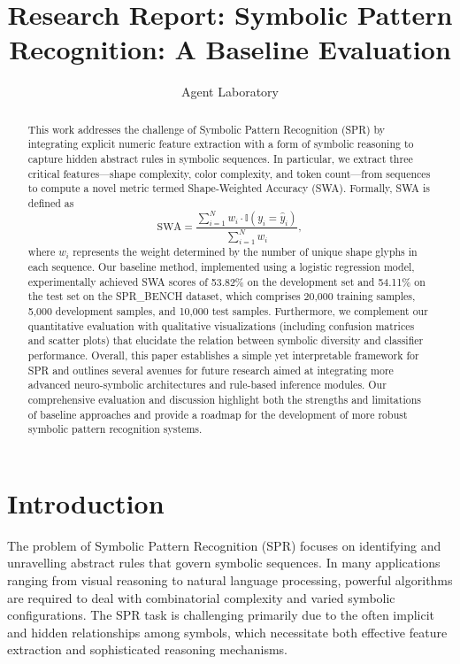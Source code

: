 \documentclass{article}
\title{Research Report: Symbolic Pattern Recognition: A Baseline Evaluation}
\author{Agent Laboratory}
\date{}
\begin{document}
\maketitle

\begin{abstract}
This work addresses the challenge of Symbolic Pattern Recognition (SPR) by integrating explicit numeric feature extraction with a form of symbolic reasoning to capture hidden abstract rules in symbolic sequences. In particular, we extract three critical features—shape complexity, color complexity, and token count—from sequences to compute a novel metric termed Shape-Weighted Accuracy (SWA). Formally, SWA is defined as 
\[
\text{SWA} = \frac{\sum_{i=1}^N w_i \cdot \mathbb{I}(y_i = \hat{y}_i)}{\sum_{i=1}^N w_i},
\]
where \(w_i\) represents the weight determined by the number of unique shape glyphs in each sequence. Our baseline method, implemented using a logistic regression model, experimentally achieved SWA scores of 53.82\% on the development set and 54.11\% on the test set on the SPR\_BENCH dataset, which comprises 20,000 training samples, 5,000 development samples, and 10,000 test samples. Furthermore, we complement our quantitative evaluation with qualitative visualizations (including confusion matrices and scatter plots) that elucidate the relation between symbolic diversity and classifier performance. Overall, this paper establishes a simple yet interpretable framework for SPR and outlines several avenues for future research aimed at integrating more advanced neuro-symbolic architectures and rule-based inference modules. Our comprehensive evaluation and discussion highlight both the strengths and limitations of baseline approaches and provide a roadmap for the development of more robust symbolic pattern recognition systems.
\end{abstract}

\section{Introduction}
The problem of Symbolic Pattern Recognition (SPR) focuses on identifying and unravelling abstract rules that govern symbolic sequences. In many applications ranging from visual reasoning to natural language processing, powerful algorithms are required to deal with combinatorial complexity and varied symbolic configurations. The SPR task is challenging primarily due to the often implicit and hidden relationships among symbols, which necessitate both effective feature extraction and sophisticated reasoning mechanisms.
\end{document}
